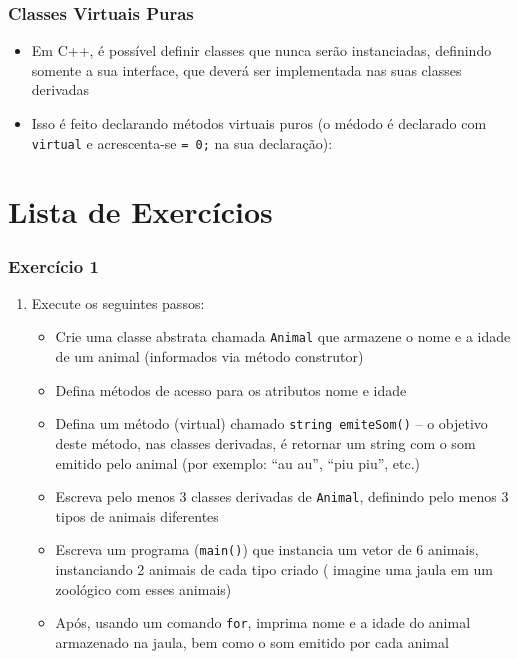 \documentclass[aspectratio=169]{beamer}
\newcommand\setItemnumber[1]{\setcounter{enumi}{\numexpr#1-1\relax}}
\begin{document}
\begin{frame}[fragile]\frametitle{Classes Virtuais Puras}
\begin{itemize}
\item Em C++, é possível definir classes que nunca serão instanciadas, definindo somente a sua interface, que deverá ser implementada nas suas classes derivadas
\item Isso é feito declarando métodos virtuais puros (o médodo é declarado com \texttt{virtual} e acrescenta-se \texttt{= 0;} na sua declaração):

\end{itemize}
\end{frame}

\section{Lista de Exercícios}

\begin{frame}[fragile]\frametitle{Exercício 1}
\begin{enumerate}
	\setItemnumber{1}
	\item Execute os seguintes passos:
	\begin{itemize}
		\item Crie uma classe abstrata chamada \texttt{Animal} que armazene o nome e a idade de um animal (informados via método construtor)
		\item Defina métodos de acesso para os atributos nome e idade
		\item Defina um método (virtual) chamado \texttt{string emiteSom()} -- o objetivo deste método, nas classes derivadas, é retornar um string com o som emitido pelo animal (por exemplo: ``au au'', ``piu piu'', etc.)
		\item Escreva pelo menos 3 classes derivadas de \texttt{Animal}, definindo pelo menos 3 tipos de animais diferentes
		\item Escreva um programa (\texttt{main()}) que instancia um vetor de 6 animais, instanciando 2 animais de cada tipo criado (	imagine uma jaula em um zoológico com esses animais)
		\item Após, usando um comando \texttt{for}, imprima nome e a idade do animal armazenado na jaula, bem como o som emitido por cada animal
	\end{itemize}
\end{enumerate}
\end{frame}
\end{document}
